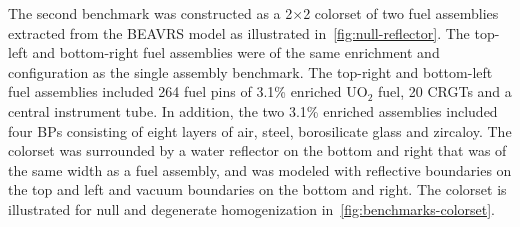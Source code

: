 The second benchmark was constructed as a 2$\times$2 colorset of two fuel assemblies extracted from the BEAVRS model as illustrated in~\autoref{fig:null-reflector}. The top-left and bottom-right fuel assemblies were of the same enrichment and configuration as the single assembly benchmark. The top-right and bottom-left fuel assemblies included 264 fuel pins of 3.1\% enriched UO$_2$ fuel, 20 CRGTs and a central instrument tube. In addition, the two 3.1\% enriched assemblies included four BPs consisting of eight layers of air, steel, borosilicate glass and zircaloy. The colorset was surrounded by a water reflector on the bottom and right that was of the same width as a fuel assembly, and was modeled with reflective boundaries on the top and left and vacuum boundaries on the bottom and right. The colorset is illustrated for null and degenerate homogenization in~\autoref{fig:benchmarks-colorset}.

